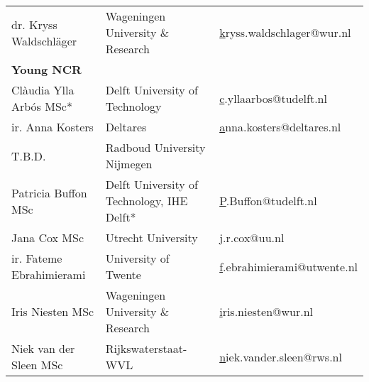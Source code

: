 \begin{longtable}{lll}
\rowcolor[HTML]{B9C6D5} 
dr. Kryss Waldschläger                 & Wageningen University   \& Research                   & {\color[HTML]{0563C1} {\ul kryss.waldschlager@wur.nl}}       \\
\rowcolor[HTML]{C9D6D6} 
\textbf{Young NCR}                     &                                                       &                                                              \\
\rowcolor[HTML]{B9C6D5} 
Clàudia Ylla Arbós MSc*                & Delft University of   Technology                      & {\color[HTML]{0563C1} {\ul c.yllaarbos@tudelft.nl}}          \\
\rowcolor[HTML]{C9D6D6} 
ir. Anna Kosters                       & Deltares                                              & {\color[HTML]{0563C1} {\ul anna.kosters@deltares.nl}}        \\
\rowcolor[HTML]{B9C6D5} 
T.B.D.                                 & Radboud University   Nijmegen                         &                                                              \\
\rowcolor[HTML]{C9D6D6} 
Patricia Buffon MSc                    & Delft University of   Technology, IHE Delft*          & {\color[HTML]{0563C1} {\ul P.Buffon@tudelft.nl}}             \\
\rowcolor[HTML]{B9C6D5} 
Jana Cox MSc                           & Utrecht University                                    & {\color[HTML]{0563C1} {\ul j.r.cox@uu.nl}}                   \\
\rowcolor[HTML]{C9D6D6} 
ir. Fateme Ebrahimierami               & University of Twente                                  & {\color[HTML]{0563C1} {\ul f.ebrahimierami@utwente.nl}}      \\
\rowcolor[HTML]{B9C6D5} 
Iris Niesten MSc                       & Wageningen University   \& Research                   & {\color[HTML]{0563C1} {\ul iris.niesten@wur.nl}}             \\
\rowcolor[HTML]{C9D6D6} 
Niek van der Sleen MSc                 & Rijkswaterstaat-WVL                                   & {\color[HTML]{0563C1} {\ul niek.vander.sleen@rws.nl}}       
\end{longtable}



